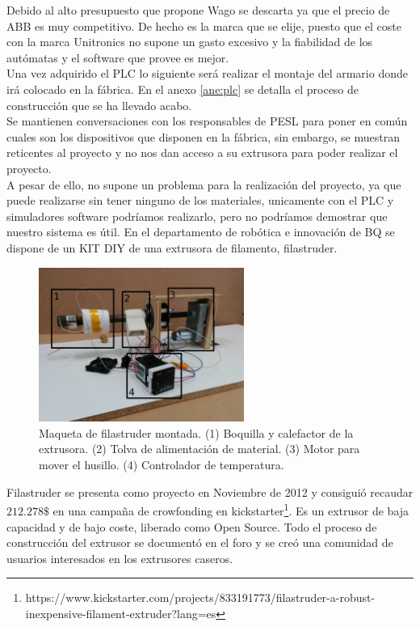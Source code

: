 Debido al alto presupuesto que propone Wago se descarta ya que el precio de ABB es muy competitivo. De hecho es la marca que se elije, puesto que el coste con la marca Unitronics no supone un gasto excesivo y la fiabilidad de los autómatas y el software que provee es mejor.\\

Una vez adquirido el PLC lo siguiente será realizar el montaje del armario donde irá colocado en la fábrica. En el anexo \ref{ane:plc} se detalla el proceso de construcción que se ha llevado acabo.\\

Se mantienen conversaciones con los responsables de PESL para poner en común cuales son los dispositivos que disponen en la fábrica, sin embargo, se muestran reticentes al proyecto y no nos dan acceso a su extrusora para poder realizar el proyecto.\\

A pesar de ello, no supone un problema para la realización del proyecto, ya que puede realizarse sin tener ninguno de los materiales, unicamente con el PLC y simuladores software podríamos realizarlo, pero no podríamos demostrar que nuestro sistema es útil. En el departamento de robótica e innovación de BQ se dispone de un KIT DIY de una extrusora de filamento, filastruder.\\

    \begin{figure}[H]
            \centering
            \includegraphics[width=0.6\textwidth]{images/filaextruder/IMG_20150313_11163.jpg}
            \caption[Maqueta de filastruder montada]{Maqueta de filastruder montada. (1) Boquilla y calefactor de la extrusora. (2) Tolva de alimentación de material. (3) Motor para mover el husillo. (4) Controlador de temperatura.}
            \label{fig:hardware_filastruder}
    \end{figure}

Filastruder se presenta como proyecto en Noviembre de 2012 \cite{filastruder} y consiguió recaudar $212.278 \$$ en una campaña de crowfonding en kickstarter\footnote{https://www.kickstarter.com/projects/833191773/filastruder-a-robust-inexpensive-filament-extruder?lang=es}. Es un extrusor de baja capacidad y de bajo coste, liberado como Open Source. Todo el proceso de construcción del extrusor se documentó en el foro y se creó una comunidad de usuarios interesados en los extrusores caseros.\\

